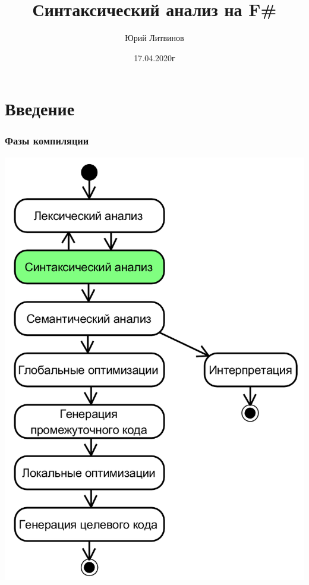 \documentclass[xetex,mathserif,serif]{beamer}
\title{Синтаксический анализ на F\#}
\author{Юрий Литвинов}
\date{17.04.2020г}
\begin{document}
	
	\frame{\titlepage}

	\section{Введение}

	\begin{frame}
		\frametitle{Фазы компиляции}
		\begin{center}
			\includegraphics[height=0.8\textheight]{compilerPhases.png}
		\end{center}
	\end{frame}
\end{document}
